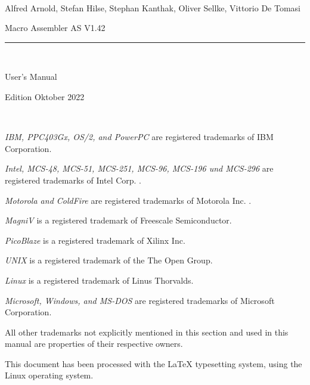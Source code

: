 \documentclass[12pt,twoside]{report}
\begin{document}
\thispagestyle{empty}

\
\vspace{7cm}\par

\begin{raggedright}
{\large Alfred Arnold, Stefan Hilse, Stephan Kanthak, Oliver
 Sellke, Vittorio De Tomasi}
\vspace{1cm}\par
{\huge Macro Assembler AS V1.42}\\
\rule{9.5cm}{0.3mm}\\
\vspace{2mm}\par
{\huge User's Manual}

\vspace{1cm}\par

{\large Edition Oktober 2022}
\end{raggedright}

\clearpage
\thispagestyle{empty}

\ \vspace{5cm}

{\em IBM, PPC403Gx, OS/2, and PowerPC} are registered trademarks of IBM
Corporation.

{\em Intel, MCS-48, MCS-51, MCS-251, MCS-96, MCS-196 und MCS-296} are
registered trademarks of Intel Corp. .

{\em Motorola and ColdFire} are registered trademarks of Motorola Inc. .

{\em MagniV} is a registered trademark of Freescale Semiconductor.

{\em PicoBlaze} is a registered trademark of Xilinx Inc.

{\em UNIX} is a registered trademark of the The Open Group.

{\em Linux} is a registered trademark of Linus Thorvalds.

{\em Microsoft, Windows, and MS-DOS} are registered trademarks of
Microsoft Corporation.

All other trademarks not explicitly mentioned in this section and used in
this manual are properties of their respective owners.

\vspace{5cm}

This document has been processed with the LaTeX typesetting system, using
the Linux operating system.

\clearpage

\end{document}
